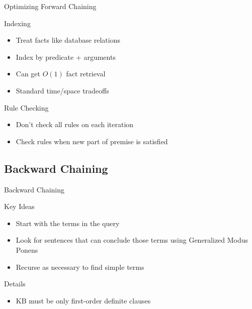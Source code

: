 \documentclass[14pt]{beamer}
\begin{document}
\begin{frame}{Optimizing Forward Chaining}
	\begin{block}{Indexing}
		\begin{itemize}
			\item Treat facts like database relations
			\item Index by predicate + arguments
			\item Can get $O(1)$ fact retrieval
			\item Standard time/space tradeoffs
		\end{itemize}
	\end{block}
	\begin{block}{Rule Checking}
		\begin{itemize}
			\item Don't check all rules on each iteration
			\item Check rules when new part of premise is satisfied
		\end{itemize}
	\end{block}
\end{frame}

\subsection{Backward Chaining}
\begin{frame}{Backward Chaining}
	\begin{block}{Key Ideas}
		\begin{itemize}
			\item Start with the terms in the query
			\item Look for sentences that can conclude those terms using Generalized Modus Ponens
			\item Recurse as necessary to find simple terms
		\end{itemize}
	\end{block}
	\begin{block}{Details}
		\begin{itemize}
			\item KB must be only first-order definite clauses
		\end{itemize}
	\end{block}
\end{frame}
\end{document}
